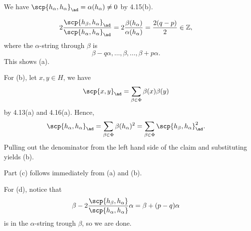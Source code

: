 We have $\scp{h_\alpha, h_\alpha}_{\ad} = \alpha(h_\alpha) \neq 0$ by 4.15(b).

\[ 2 \frac{\scp{h_\beta, h_\alpha}_{\ad}}{\scp{h_\alpha, h_\alpha}_{\ad}}
= 2\frac{\beta(h_\alpha)}{\alpha(h_\alpha)} = \frac{2(q-p)}{2} \in \mathbb{Z}, \]
where the $\alpha$-string through $\beta$ is
\[ \beta-q\alpha, \ldots, \beta, \ldots, \beta+p\alpha. \]
This shows (a).

For (b), let $x, y \in H$, we have
\[ \scp{x, y}_{\ad} = \sum_{\beta \in \Phi} \beta(x)\beta(y) \]
by 4.13(a) and 4.16(a).
Hence,
\[ \scp{h_\alpha, h_\alpha}_{\ad} = \sum_{\beta \in \Phi} \beta(h_\alpha)^2 = \sum_{\beta \in \Phi}\scp{h_\beta, h_\alpha}_{\ad}^2. \]
Pulling out the denominator from the left hand side of the claim and substituting
yields (b).

Part (c) follows immediately from (a) and (b).

For (d), notice that
\[ \beta - 2\frac{\scp{h_\beta, h_\alpha}}{\scp{h_\alpha, h_\alpha}}\alpha = \beta + (p-q)\alpha \]
is in the $\alpha$-string trough $\beta$, so we are done.

